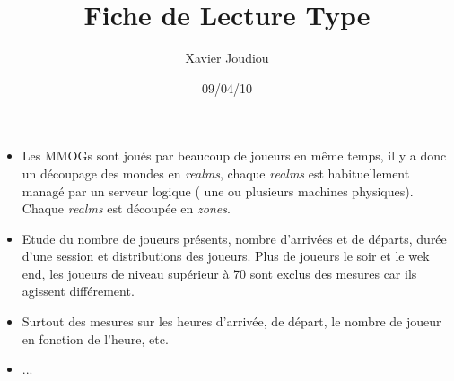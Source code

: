 \documentclass[11pt,a4paper]{article}
\title{Fiche de Lecture Type}
\author{Xavier Joudiou}
\date{09/04/10}
\begin{document}
	
  \begin{itemize}
  \renewcommand{\labelitemi}{$\Rightarrow$}
	\item Les MMOGs sont joués par beaucoup de joueurs en même temps, il y a donc un découpage des mondes en \textit{realms}, chaque \textit{realms} est habituellement managé par un serveur logique ( une ou plusieurs machines physiques). Chaque \textit{realms} est découpée en \textit{zones}.
	\item Etude du nombre de joueurs présents, nombre d'arrivées et de départs, durée d'une session et distributions des joueurs. Plus de joueurs le soir et le wek end, les joueurs de niveau supérieur à 70 sont exclus des mesures car ils agissent différement.
	\item Surtout des mesures sur les heures d'arrivée, de départ, le nombre de joueur en fonction de l'heure, etc.
	\item ...
  \end{itemize}
\end{document}
